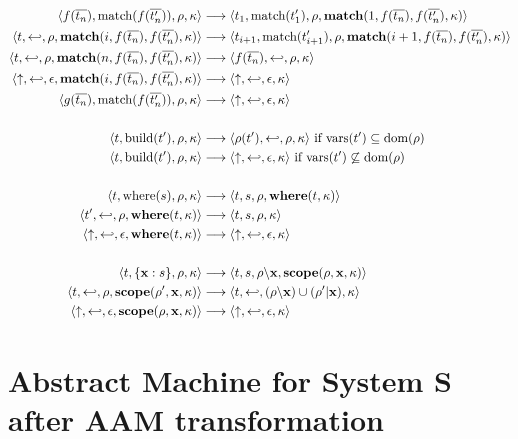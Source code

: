 \documentclass{article}
\begin{document}
{\begin{align*}
  \langle f(\overline{t_n}),\text{match}(f(\overline{t_n'})),\rho,\kappa \rangle & \longrightarrow \langle t_1,\text{match}(t_1'),\rho,\mathbf{match}(1,f(\overline{t_n}),f(\overline{t_n'}),\kappa) \rangle \\
  \langle t,\hookleftarrow,\rho,\mathbf{match}(i,f(\overline{t_n}),f(\overline{t_n'}),\kappa) \rangle & \longrightarrow \langle t_{i+1},\text{match}(t_{i+1}'),\rho,\mathbf{match}(i+1,f(\overline{t_n}),f(\overline{t_n'}),\kappa) \rangle \\
  \langle t,\hookleftarrow,\rho,\mathbf{match}(n,f(\overline{t_n}),f(\overline{t_n'}),\kappa) \rangle & \longrightarrow \langle f(\overline{t_n}),\hookleftarrow,\rho,\kappa \rangle \\
  \langle \uparrow,\hookleftarrow,\epsilon,\mathbf{match}(i,f(\overline{t_n}),f(\overline{t_n'}),\kappa) \rangle & \longrightarrow \langle \uparrow,\hookleftarrow,\epsilon,\kappa \rangle \\
  \langle g(\overline{t_n}),\text{match}(f(\overline{t_n'})),\rho,\kappa \rangle & \longrightarrow \langle \uparrow,\hookleftarrow,\epsilon,\kappa \rangle \\
  \notag \\
  \langle t,\text{build}(t'),\rho,\kappa \rangle & \longrightarrow \langle \rho(t'),\hookleftarrow,\rho,\kappa \rangle \text{ if } \text{vars}(t') \subseteq \text{dom}(\rho) \\
  \langle t,\text{build}(t'),\rho,\kappa \rangle & \longrightarrow \langle \uparrow,\hookleftarrow,\epsilon,\kappa \rangle \text{ if } \text{vars}(t') \not\subseteq \text{dom}(\rho) \\
  \notag \\
  \langle t,\text{where}(s),\rho,\kappa \rangle & \longrightarrow \langle t,s,\rho,\mathbf{where}(t,\kappa) \rangle \\
  \langle t',\hookleftarrow,\rho,\mathbf{where}(t,\kappa) \rangle & \longrightarrow \langle t,s,\rho,\kappa \rangle \\
  \langle \uparrow,\hookleftarrow,\epsilon,\mathbf{where}(t,\kappa) \rangle & \longrightarrow \langle \uparrow,\hookleftarrow,\epsilon,\kappa \rangle \\
  \notag \\
  \langle t,\lbrace \mathbf{x} : s \rbrace,\rho,\kappa \rangle & \longrightarrow \langle t,s,\rho \backslash \mathbf{x},\mathbf{scope}(\rho,\mathbf{x},\kappa) \rangle \\
  \langle t,\hookleftarrow,\rho,\mathbf{scope}(\rho',\mathbf{x},\kappa) \rangle & \longrightarrow \langle t,\hookleftarrow,(\rho \backslash \mathbf{x}) \cup (\rho' | \mathbf{x}),\kappa \rangle \\
  \langle \uparrow,\hookleftarrow,\epsilon,\mathbf{scope}(\rho,\mathbf{x},\kappa) \rangle & \longrightarrow \langle \uparrow,\hookleftarrow,\epsilon,\kappa \rangle \\
\end{align*}

\clearpage
\section*{Abstract Machine for System S after AAM transformation}

}
\end{document}
